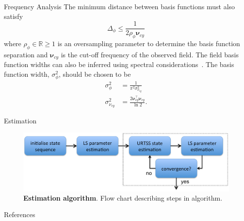 \documentclass[final]{beamer}
\newlength{\onecolwid}
\begin{document}
\begin{frame}[t]
\begin{columns}[t]
\begin{column}{\onecolwid}
\begin{block}{Frequency Analysis}
{		The minimum distance between basis functions must also satisfy 
		\begin{equation}\label{eq:BasisFunctionSeparation}
			\Delta_{\phi} \leq \frac{1}{2\rho_{\phi}\boldsymbol{\nu}_{cy}}
		\end{equation}
		where $\rho_{\phi} \in \mathbb{R} \ge 1$ is an oversampling parameter to determine the basis function separation and $\boldsymbol{\nu}_{cy}$ is the cut-off frequency of the observed field.
		The field basis function widths can also be inferred using spectral considerations~\cite{Scerri2009}. The basis function width, $\sigma^2_{\phi}$, should be chosen to be
		\begin{align}\label{eq:WidthCutOffRelationship}
		 \sigma^2_{\phi} &= \frac{1}{\pi^2\sigma_{\nu_{cy}}^2} \\
		 \sigma^2_{\nu_{cy}} &= \frac{2\boldsymbol\nu_{cy}^\top \boldsymbol\nu_{cy}}{\ln2}.
		\end{align}}
	\end{block}
	\begin{block}{Estimation}
		\begin{figure}	
		\begin{center}
		  \includegraphics[width=10.5in, scale = 10]{EstimationAlgorithm.eps}
		\end{center}
		\caption{{\bf Estimation algorithm}. Flow chart describing steps in algorithm.} 
		\label{fig:Estimation Algorithm}	
		\end{figure} 
	\end{block}	
	\begin{block}{References}
        \small{}	\end{block}
\end{column}


\end{columns}
\end{frame}
\end{document}
